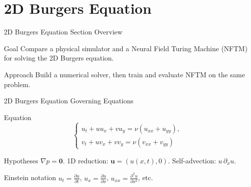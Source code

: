 \section{2D Burgers Equation}

\begin{frame}{2D Burgers Equation}
\small
\textcolor{red_unipd}{\Large Section Overview}

\begin{alertblock}{Goal}
    Compare a physical simulator and a Neural Field Turing Machine (NFTM) for solving the 2D Burgers equation.

\end{alertblock}

\begin{block}{Approach}
Build a numerical solver, then train and evaluate NFTM on the same problem.
\end{block}
\end{frame}

\begin{frame}{2D Burgers Equation}
\small
\textcolor{red_unipd}{\Large Governing Equations}

\vspace{0.6em}

\begin{alertblock}{Equation}
\[
\begin{cases}
  u_t + u u_x + v u_y = \nu (u_{xx} + u_{yy}), \\
  v_t + u v_x + v v_y = \nu (v_{xx} + v_{yy})
\end{cases}
\]
\end{alertblock}

\vfill

\begin{block}{Hypotheses}
\(\nabla p=\mathbf{0}\). \quad
1D reduction: \(\mathbf{u}=(u(x,t),0)\). \quad
Self-advection: \(u\,\partial_x u\).
\end{block}

\vspace{0.5em}

\begin{block}{Einstein notation}
$u_t = \frac{\partial u}{\partial t}$, $u_x = \frac{\partial u}{\partial x}$, $u_{xx} = \frac{\partial^2 u}{\partial x^2}$, etc.
\end{block}


\end{frame}

